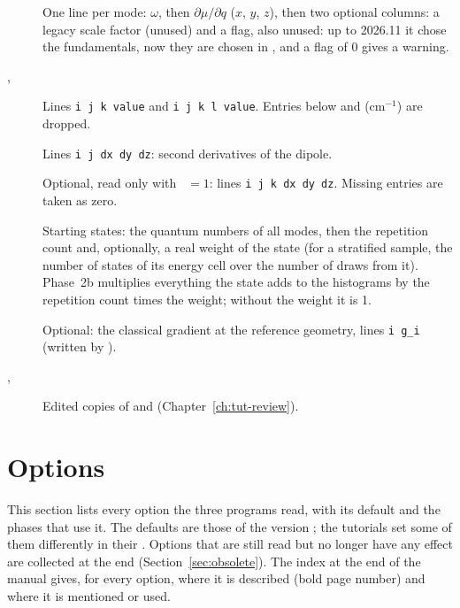 \begin{description}
\item[] One line per mode: $\omega$, then
  $\partial\mu/\partial q$ ($x$, $y$, $z$), then two optional columns: a
  legacy scale factor (unused) and a flag, also unused: up to 2026.11 it
  chose the fundamentals, now they are chosen in , and a
  flag of 0 gives a warning.
\item[, ] Lines \texttt{i j k value} and
  \texttt{i j k l value}. Entries below  and
   (cm$^{-1}$) are dropped.
\item[] Lines \texttt{i j dx dy dz}: second derivatives of
  the dipole.
\item[] Optional, read only with ~$=1$: lines
  \texttt{i j k dx dy dz}. Missing entries are taken as zero.
\item[] Starting states: the quantum numbers of all modes,
  then the repetition count and, optionally, a real weight of the state
  (for a stratified sample, the number of states of its energy cell over
  the number of draws from it). Phase~2b multiplies everything the state
  adds to the histograms by the repetition count times the weight; without
  the weight it is 1.
\item[] Optional: the classical gradient at the reference
  geometry, lines \texttt{i g\_i} (written by ).
\item[, ] Edited copies of
   and 
  (Chapter~\ref{ch:tut-review}).
\end{description}

\section{Options}\label{sec:options}

This section lists every option the three programs read, with its
default and the phases that use it. The defaults are those of the
version \acversion{}; the tutorials set some of them differently in their
. Options that are still read but no longer have any effect are
collected at the end (Section~\ref{sec:obsolete}). The index at the end
of the manual gives, for every option, where it is described (bold page
number) and where it is mentioned or used.


